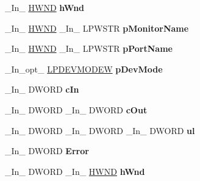 \begin{DoxyCompactItemize}
\+\_\+\+In\+\_\+ \hyperlink{interfacevoid}{H\+W\+ND} {\bfseries h\+Wnd}
\item 
\mbox{\label{struct___p_r_i_n_t_p_r_o_v_i_d_o_r_a0baa5947c38a443eec1466a2a98c4c40}} 
\+\_\+\+In\+\_\+ \hyperlink{interfacevoid}{H\+W\+ND} \+\_\+\+In\+\_\+ L\+P\+W\+S\+TR {\bfseries p\+Monitor\+Name}
\item 
\mbox{\label{struct___p_r_i_n_t_p_r_o_v_i_d_o_r_ac33b4aef803d1fa065793f7a1fe0589c}} 
\+\_\+\+In\+\_\+ \hyperlink{interfacevoid}{H\+W\+ND} \+\_\+\+In\+\_\+ L\+P\+W\+S\+TR {\bfseries p\+Port\+Name}
\item 
\mbox{\label{struct___p_r_i_n_t_p_r_o_v_i_d_o_r_a761c063b453069574c54f12a58c2076b}} 
\+\_\+\+In\+\_\+opt\+\_\+ \hyperlink{struct__devicemode_w}{L\+P\+D\+E\+V\+M\+O\+D\+EW} {\bfseries p\+Dev\+Mode}
\item 
\mbox{\label{struct___p_r_i_n_t_p_r_o_v_i_d_o_r_a8a0b06b25a8cee672dbd013840fd7f0f}} 
\+\_\+\+In\+\_\+ D\+W\+O\+RD {\bfseries c\+In}
\item 
\mbox{\label{struct___p_r_i_n_t_p_r_o_v_i_d_o_r_a7c713a3b5d0d3795763a350e9d4e7a30}} 
\+\_\+\+In\+\_\+ D\+W\+O\+RD \+\_\+\+In\+\_\+ D\+W\+O\+RD {\bfseries c\+Out}
\item 
\mbox{\label{struct___p_r_i_n_t_p_r_o_v_i_d_o_r_a5e52570e2ce6d7558ab5a125f457c497}} 
\+\_\+\+In\+\_\+ D\+W\+O\+RD \+\_\+\+In\+\_\+ D\+W\+O\+RD \+\_\+\+In\+\_\+ D\+W\+O\+RD {\bfseries ul}
\item 
\mbox{\label{struct___p_r_i_n_t_p_r_o_v_i_d_o_r_a0d86b760651a778754494c9d13687447}} 
\+\_\+\+In\+\_\+ D\+W\+O\+RD {\bfseries Error}
\item 
\mbox{\label{struct___p_r_i_n_t_p_r_o_v_i_d_o_r_adaedccd3732d96c1a9aad511aeab24d8}} 
\+\_\+\+In\+\_\+ D\+W\+O\+RD \+\_\+\+In\+\_\+ \hyperlink{interfacevoid}{H\+W\+ND} {\bfseries h\+Wnd}
\item 
\mbox{\label{struct___p_r_i_n_t_p_r_o_v_i_d_o_r_a053f2479c2bed7899bca768d4ed6fafe}} 

\end{DoxyCompactItemize}
